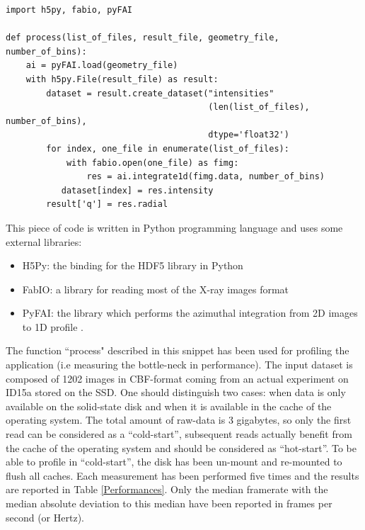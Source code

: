 \documentclass[preprint]{iucr}              %
\begin{document}
\begin{minipage}{\linewidth}
\label{snippet}
\label{sequential}
\begin{verbatim}
import h5py, fabio, pyFAI

def process(list_of_files, result_file, geometry_file, number_of_bins):
    ai = pyFAI.load(geometry_file)
    with h5py.File(result_file) as result:
        dataset = result.create_dataset("intensities"
                                        (len(list_of_files), number_of_bins),
                                        dtype='float32') 
        for index, one_file in enumerate(list_of_files):
            with fabio.open(one_file) as fimg:
                res = ai.integrate1d(fimg.data, number_of_bins)
           dataset[index] = res.intensity
        result['q'] = res.radial
\end{verbatim}
\end{minipage}

This piece of code is written in Python \cite{python} programming language and
uses some external libraries:
\begin{itemize}
  \item {H5Py}: the binding for the HDF5 library in Python \cite{h5py}
  \item{FabIO}: a library for reading most of the X-ray images format
  \cite{fabio}
  \item{PyFAI}: the library which performs the azimuthal
  integration from 2D images to 1D profile \cite{pyFAI}. 
\end{itemize}

The function ``process" described in this snippet has been used for
profiling the application (i.e measuring the bottle-neck in performance). 
The input dataset is composed of 1202 images in CBF-format coming from an actual
experiment on ID15a stored on the SSD.
One should distinguish two cases: when data is only available on the
solid-state disk and when it is available in the cache of the
operating system.
The total amount of raw-data is 3 gigabytes, so only the first read can be
considered as a ``cold-start'', subsequent reads actually benefit from
the cache of the operating system and should be considered as ``hot-start''.
To be able to profile in ``cold-start'', the disk has been un-mount and re-mounted
to flush all caches.
Each measurement has been performed five times and the results are reported in
Table \ref{Performances}.  Only the median framerate  with the median absolute
deviation to this median have been reported in frames per second (or Hertz).
\end{document}
